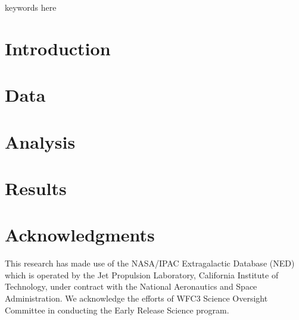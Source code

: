 \documentclass[useAMS,usenatbib]{mn2e}
\begin{document}
\begin{abstract}
%
\end{abstract}

\begin{keywords}
keywords here
\end{keywords}

\section{Introduction}


\section{Data}


\section{Analysis}


\section{Results}


%
%
%


\section*{Acknowledgments}

This research has made use of the NASA/IPAC Extragalactic Database (NED) which is operated by the Jet Propulsion Laboratory,
California Institute of Technology, under contract with the National Aeronautics and Space Administration. 
We acknowledge the efforts of WFC3 Science Oversight Committee in conducting the Early Release Science program.


{}

\bsp



\appendix

\label{lastpage}
\end{document}
